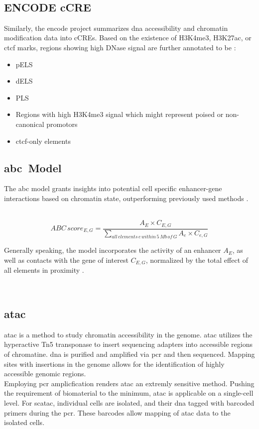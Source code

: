     \subsection{ENCODE \acs{cCRE}}
    Similarly, the \ac{encode} project summarizes \ac{dna} accessibility and chromatin modification data into \acfp{cCRE}. Based on the existence of \ac{H3K4me3}, \ac{H3K27ac}, or \ac{ctcf} marks, regions showing high DNase signal are further annotated to be \cite{mooreExpandedEncyclopaediasDNA2020}:
    \begin{itemize}
        \item \ac{pELS}
        \item \ac{dELS}
        \item \ac{PLS}
        \item Regions with high \ac{H3K4me3} signal which might represent poised or non-canonical promotors
        \item \ac{ctcf}-only elements
    \end{itemize}

    \subsection{\acs{abc} Model}
    The \acf{abc} model grants insights into potential cell specific enhancer-gene interactions based on chromatin state, outperforming previously used methods \cite{fulcoActivitybycontactModelEnhancer2019a, nasserGenomewideEnhancerMaps2021a}.

        $$ ABC\,score_{E, G} = \frac{A_E \times C_{E,G}}{\sum\limits_{all\,elements\,e\,within\,5\,Mb\,of\,G} A_e \times C_{e, G}} $$

    Generally speaking, the model incorporates the activity of an enhancer $A_E$, as well as contacts with the gene of interest $C_{E,G}$, normalized by the total effect of all elements in proximity \cite{fulcoActivitybycontactModelEnhancer2019a, nasserGenomewideEnhancerMaps2021a}.

    \subsection{\acs{atac}}
    \Acf{atac} is a method to study chromatin accessibility in the genome. \Ac{atac} utilizes the hyperactive Tn5 transponase to insert sequencing adapters into accessible regions of chromatine. \ac{dna} is purified and amplified via \ac{pcr} and then sequenced. Mapping sites with insertions in the genome allows for the identification of highly accessible genomic regions. \cite{buenrostroTranspositionNativeChromatin2013, buenrostroATACseqMethodAssaying2015}\\
    Employing \ac{pcr} amplicfication renders \ac{atac} an extremly sensitive method. Pushing the requirement of biomaterial to the minimum, \ac{atac} is applicable on a single-cell level. For sc\ac{atac}, individual cells are isolated, and their \ac{dna} tagged with barcoded primers during the \ac{pcr}. These barcodes allow mapping of \ac{atac} data to the isolated cells. \cite{buenrostroSinglecellChromatinAccessibility2015}

